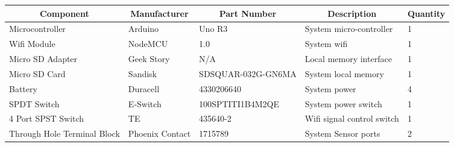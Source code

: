 \documentclass[12pt, titlepage]{article}
\begin{document}
\begin{table}[H]
  \centering
  \begin{tabular}{|p{3cm}|p{2cm}|p{4cm}|p{4cm}|p{2cm}|}
  \hline
  \multicolumn{1}{|c|}{\textbf{Component}} & \multicolumn{1}{c|}{\textbf{Manufacturer}} & \multicolumn{1}{c|}{\textbf{Part Number}} & \multicolumn{1}{c|}{\textbf{Description}} & \multicolumn{1}{|c|}{\textbf{Quantity}}
  \\ \hline
  Microcontroller
  & Arduino
  & Uno R3
  & System micro-controller
  & 1
  \newline                                
  \\ \hline

  Wifi Module                              
  & NodeMCU
  & 1.0
  & System wifi 
  & 1
  \newline                                
  \\ \hline

  Micro SD Adapter                          
  & Geek Story
  & N/A
  & Local memory interface
  & 1
  \newline                                
  \\ \hline

  Micro SD Card                                
  & Sandisk
  & SDSQUAR-032G-GN6MA
  & System local memory
  & 1
  \newline                            
  \\ \hline

  Battery                                
  & Duracell
  & 4330206640
  & System power
  & 4
  \newline                            
  \\ \hline

  SPDT Switch                                
  & E-Switch
  & 100SPTITI1B4M2QE
  & System power switch
  & 1
  \newline                            
  \\ \hline

  4 Port SPST Switch                                
  & TE
  & 435640-2
  & Wifi signal control switch
  & 1
  \newline                            
  \\ \hline

  Through Hole Terminal Block                                
  & Phoenix Contact
  & 1715789
  & System Sensor ports
  & 2
  \newline                            
  \\ \hline


\end{tabular}
\end{table}
\end{document}

